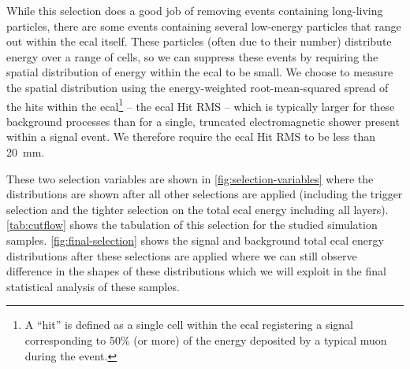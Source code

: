 While this selection does a good job of removing events containing long-living particles, there are some
events containing several low-energy particles that range out within the \ac{ecal} itself.
These particles (often due to their number) distribute energy over a range of cells,
so we can suppress these events by requiring the spatial distribution of energy within the \ac{ecal} to be small.
We choose to measure the spatial distribution using the energy-weighted root-mean-squared spread of the
hits within the \ac{ecal}\footnote{
  A ``hit'' is defined as a single cell within the \ac{ecal} registering a signal corresponding to 50\% (or more)
  of the energy deposited by a typical muon during the event.
}
-- the \ac{ecal} Hit RMS -- which is typically larger for these background processes than for a single,
truncated electromagnetic shower present within a signal event.
We therefore require the \ac{ecal} Hit RMS to be less than \qty{20}{\mm}.

These two selection variables are shown in \cref{fig:selection-variables}
where the distributions are shown after all other selections are applied
(including the trigger selection and the tighter selection on the total \ac{ecal} energy including all layers).
\cref{tab:cutflow} shows the tabulation of this selection for the studied simulation samples.
\cref{fig:final-selection} shows the signal and background total \ac{ecal} energy distributions after
these selections are applied where we can still observe difference in the shapes of these distributions which
we will exploit in the final statistical analysis of these samples.


